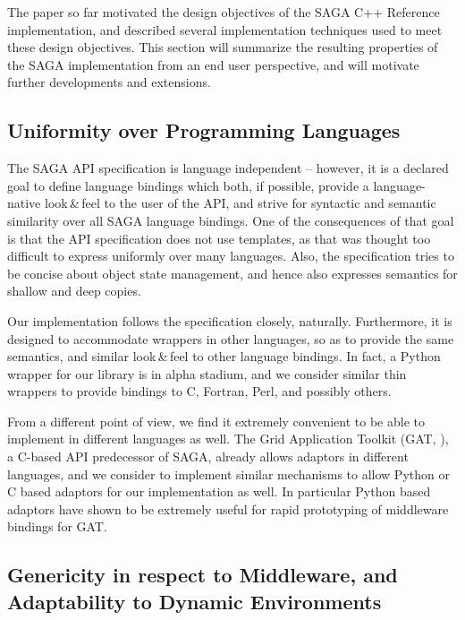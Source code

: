 
The paper so far motivated the design objectives of the SAGA C++
Reference implementation, and described several implementation
techniques used to meet these design objectives.  This section will
summarize the resulting properties of the SAGA implementation from an
end user perspective, and will motivate further developments and
extensions.


\subsection{Uniformity over Programming Languages}
\label{ssec:lang}

 The SAGA API specification is language independent -- however, it is
 a declared goal to define language bindings which both, if possible,
 provide a language-native look\,\&\,feel to the user of the API, and
 strive for syntactic and semantic similarity over all SAGA language
 bindings.  One of the consequences of that goal is that the API
 specification does not use templates, as that was thought too
 difficult to express uniformly over many languages.  Also, the
 specification tries to be concise about object state management, and
 hence also expresses semantics for shallow and deep copies.

 Our implementation follows the specification closely, naturally.  Furthermore,
 it is designed to accommodate wrappers in other languages, so as to
 provide the same semantics, and similar look\,\&\,feel to other
 language bindings.  In fact, a Python wrapper for our library is in
 alpha stadium, and we consider similar thin wrappers to provide
 bindings to C, Fortran, Perl, and possibly others.

 From a different point of view, we find it extremely convenient to be
 able to implement  in different languages as well.  The
 Grid Application Toolkit (GAT, \cite{gat}), a C-based API predecessor
 of SAGA,  already allows adaptors in different languages, and we
 consider to implement similar mechanisms to allow Python or C based
 adaptors for our implementation as well.  In particular Python based
 adaptors have shown to be extremely useful for rapid prototyping of
 middleware bindings for GAT.

\newpage
\subsection{Genericity in respect to Middleware, and
            Adaptability to Dynamic Environments}

